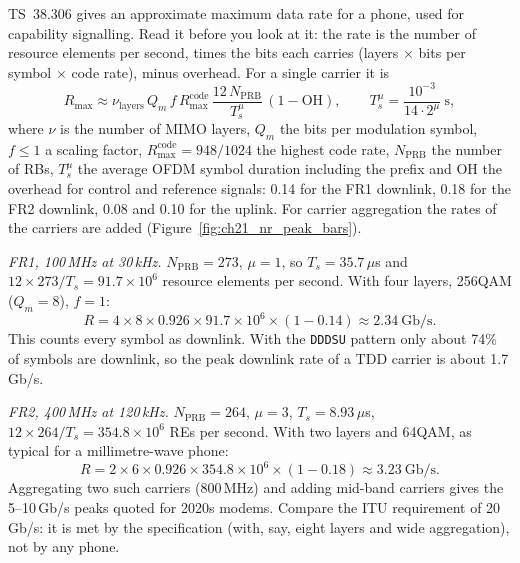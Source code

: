 TS~38.306 gives an approximate maximum data rate for a phone, used for capability signalling. Read
it before you look at it: the rate is the number of resource elements per second, times the bits each
carries (layers $\times$ bits per symbol $\times$ code rate), minus overhead. For a single carrier it is
\begin{equation}
R_{\max}\approx\nu_{\text{layers}}\,Q_m\,f\,R_{\max}^{\text{code}}\,
\frac{12\,N_{\text{PRB}}}{T_s^{\mu}}\,(1-\mathrm{OH}),
\qquad T_s^{\mu}=\frac{10^{-3}}{14\cdot2^{\mu}}\ \mathrm{s},
\label{eq:ch21:nrpeak}
\end{equation}
where $\nu$ is the number of MIMO layers, $Q_m$ the bits per modulation symbol, $f\le1$ a scaling
factor, $R_{\max}^{\text{code}}=948/1024$ the highest code rate, $N_{\text{PRB}}$ the number of RBs,
$T_s^{\mu}$ the average OFDM symbol duration including the prefix and OH the overhead for control and
reference signals: 0.14 for the FR1 downlink, 0.18 for the FR2 downlink, 0.08 and 0.10 for the
uplink. For carrier aggregation the rates of the carriers are added
(Figure~\ref{fig:ch21_nr_peak_bars}).


\begin{worked}
\emph{FR1, 100\,MHz at 30\,kHz.} $N_{\text{PRB}}=273$, $\mu=1$, so $T_s=35.7\,\mu$s and
$12\times273/T_s=91.7\times10^6$ resource elements per second. With four layers, 256QAM ($Q_m=8$),
$f=1$:
\[
R=4\times8\times0.926\times91.7\times10^6\times(1-0.14)\approx2.34\ \text{Gb/s}.
\]
This counts every symbol as downlink. With the \texttt{DDDSU} pattern only about 74\% of symbols are
downlink, so the peak downlink rate of a TDD carrier is about 1.7\,Gb/s.

\emph{FR2, 400\,MHz at 120\,kHz.} $N_{\text{PRB}}=264$, $\mu=3$, $T_s=8.93\,\mu$s,
$12\times264/T_s=354.8\times10^6$ REs per second. With two layers and 64QAM, as typical for a
millimetre-wave phone:
\[
R=2\times6\times0.926\times354.8\times10^6\times(1-0.18)\approx3.23\ \text{Gb/s}.
\]
Aggregating two such carriers (800\,MHz) and adding mid-band carriers gives the 5--10\,Gb/s peaks
quoted for 2020s modems. Compare the ITU requirement of 20\,Gb/s: it is met by the specification
(with, say, eight layers and wide aggregation), not by any phone.
\end{worked}

